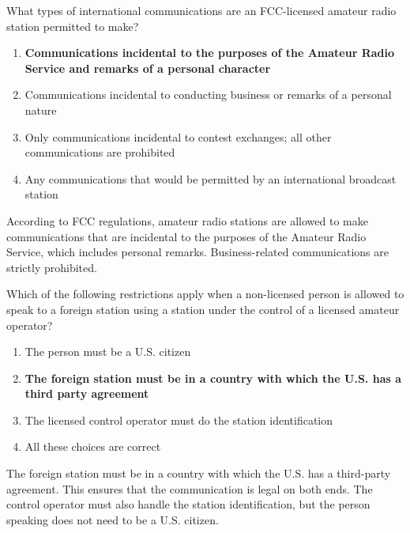\begin{tcolorbox}[colback=gray!10!white,colframe=black!75!black,title={T1C03}]
    What types of international communications are an FCC-licensed amateur radio station permitted to make?
    \begin{enumerate}[label=\Alph*),noitemsep]
        \item \textbf{Communications incidental to the purposes of the Amateur Radio Service and remarks of a personal character}
        \item Communications incidental to conducting business or remarks of a personal nature
        \item Only communications incidental to contest exchanges; all other communications are prohibited
        \item Any communications that would be permitted by an international broadcast station
    \end{enumerate}
\end{tcolorbox}

According to FCC regulations, amateur radio stations are allowed to make communications that are incidental to the purposes of the Amateur Radio Service, which includes personal remarks. Business-related communications are strictly prohibited.

\begin{tcolorbox}[colback=gray!10!white,colframe=black!75!black,title={T1F07}]
    Which of the following restrictions apply when a non-licensed person is allowed to speak to a foreign station using a station under the control of a licensed amateur operator?
    \begin{enumerate}[label=\Alph*),noitemsep]
        \item The person must be a U.S. citizen
        \item \textbf{The foreign station must be in a country with which the U.S. has a third party agreement}
        \item The licensed control operator must do the station identification
        \item All these choices are correct
    \end{enumerate}
\end{tcolorbox}

The foreign station must be in a country with which the U.S. has a third-party agreement. This ensures that the communication is legal on both ends. The control operator must also handle the station identification, but the person speaking does not need to be a U.S. citizen.

